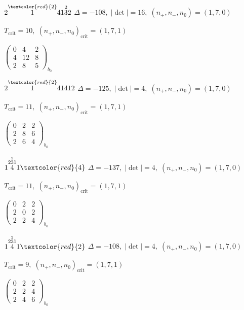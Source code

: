 \documentclass[10pt]{article}
\begin{document}
\smallskip

$2\overset{\textcolor{red}{2}}{1}41\overset{2}{3}2$ \quad $\Delta=-108,\; |\det|=16,\; (n_+,n_-,n_0)=(1,7,0)$

\hspace{1em}$T_{\text{crit}}=10,\; (n_+,n_-,n_0)_{\text{crit}}=(1,7,1)$

\hspace{2em}$\left(\begin{smallmatrix}0 & 4 & 2 \\ 4 & 12 & 8 \\ 2 & 8 & 5\end{smallmatrix}\right)_{\!b_0}$

\smallskip

$2\overset{\textcolor{red}{2}}{1}41412$ \quad $\Delta=-125,\; |\det|=4,\; (n_+,n_-,n_0)=(1,7,0)$

\hspace{1em}$T_{\text{crit}}=11,\; (n_+,n_-,n_0)_{\text{crit}}=(1,7,1)$

\hspace{2em}$\left(\begin{smallmatrix}0 & 2 & 2 \\ 2 & 8 & 6 \\ 2 & 6 & 4\end{smallmatrix}\right)_{\!b_0}$

\smallskip

$1\overset{2\overset{2}{3}1}{4}1\textcolor{red}{4}$ \quad $\Delta=-137,\; |\det|=4,\; (n_+,n_-,n_0)=(1,7,0)$

\hspace{1em}$T_{\text{crit}}=11,\; (n_+,n_-,n_0)_{\text{crit}}=(1,7,1)$

\hspace{2em}$\left(\begin{smallmatrix}0 & 2 & 2 \\ 2 & 0 & 2 \\ 2 & 2 & 4\end{smallmatrix}\right)_{\!b_0}$

$1\overset{2\overset{2}{3}1}{4}1\textcolor{red}{2}$ \quad $\Delta=-108,\; |\det|=4,\; (n_+,n_-,n_0)=(1,7,0)$

\hspace{1em}$T_{\text{crit}}=9,\; (n_+,n_-,n_0)_{\text{crit}}=(1,7,1)$

\hspace{2em}$\left(\begin{smallmatrix}0 & 2 & 2 \\ 2 & 2 & 4 \\ 2 & 4 & 6\end{smallmatrix}\right)_{\!b_0}$
\end{document}
